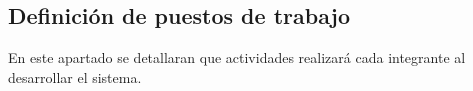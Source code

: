 \subsection{Definición de puestos de trabajo}
En este apartado se detallaran que actividades realizará cada integrante al desarrollar el sistema.

\begin{table}[h]
\begin{center}
\caption{Equipo de trabajo}
\label{equipoDeTrabajo}
\end{center}
\end{table}



